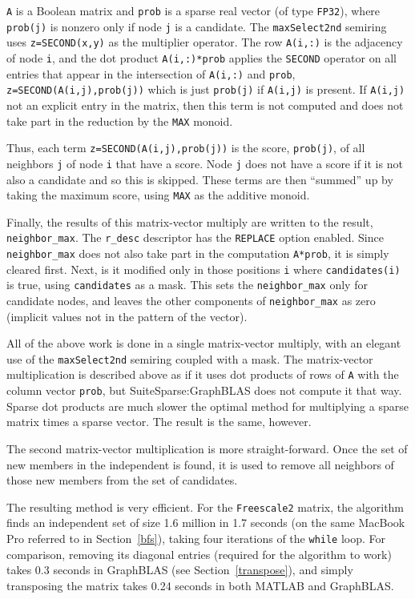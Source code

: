 \documentclass[12pt]{article}
\begin{document}
\verb'A' is a Boolean matrix and \verb'prob' is a sparse real vector (of type
\verb'FP32'), where \verb'prob(j)' is nonzero only if node \verb'j' is a
candidate.  The \verb'maxSelect2nd' semiring uses \verb'z=SECOND(x,y)' as the
multiplier operator.  The row \verb'A(i,:)' is the adjacency of node \verb'i',
and the dot product \verb'A(i,:)*prob' applies the \verb'SECOND' operator on
all entries that appear in the intersection of \verb'A(i,:)' and \verb'prob',
\verb'z=SECOND(A(i,j),prob(j))' which is just \verb'prob(j)' if \verb'A(i,j)'
is present.  If \verb'A(i,j)' not an explicit entry in the matrix, then this
term is not computed and does not take part in the reduction by the
\verb'MAX' monoid.

Thus, each term \verb'z=SECOND(A(i,j),prob(j))' is the score, \verb'prob(j)',
of all neighbors \verb'j' of node \verb'i' that have a score.  Node \verb'j'
does not have a score if it is not also a candidate and so this is skipped.
These terms are then ``summed'' up by taking the maximum score, using
\verb'MAX' as the additive monoid.

Finally, the results of this matrix-vector multiply are written to the result,
\verb'neighbor_max'.  The \verb'r_desc' descriptor has the \verb'REPLACE'
option enabled.  Since \verb'neighbor_max' does not also take part in the
computation \verb'A*prob', it is simply cleared first.  Next, is it modified
only in those positions \verb'i' where \verb'candidates(i)' is true, using
\verb'candidates' as a mask.  This sets the \verb'neighbor_max' only for
candidate nodes, and leaves the other components of \verb'neighbor_max' as zero
(implicit values not in the pattern of the vector).

All of the above work is done in a single matrix-vector multiply, with an
elegant use of the \verb'maxSelect2nd' semiring coupled with a mask.  The
matrix-vector multiplication is described above as if it uses dot products of
rows of \verb'A' with the column vector \verb'prob', but SuiteSparse:GraphBLAS
does not compute it that way.  Sparse dot products are much slower the optimal
method for multiplying a sparse matrix times a sparse vector.  The result is
the same, however.

The second matrix-vector multiplication is more straight-forward.  Once the set
of new members in the independent is found, it is used to remove all neighbors
of those new members from the set of candidates.

The resulting method is very efficient.  For the \verb'Freescale2' matrix, the
algorithm finds an independent set of size 1.6 million in 1.7 seconds (on the
same MacBook Pro referred to in Section~\ref{bfs}), taking four iterations of
the \verb'while' loop.  For comparison, removing its diagonal entries (required
for the algorithm to work) takes 0.3 seconds in GraphBLAS (see
Section~\ref{transpose}), and simply transposing the matrix takes 0.24 seconds
in both MATLAB and GraphBLAS.
\end{document}
